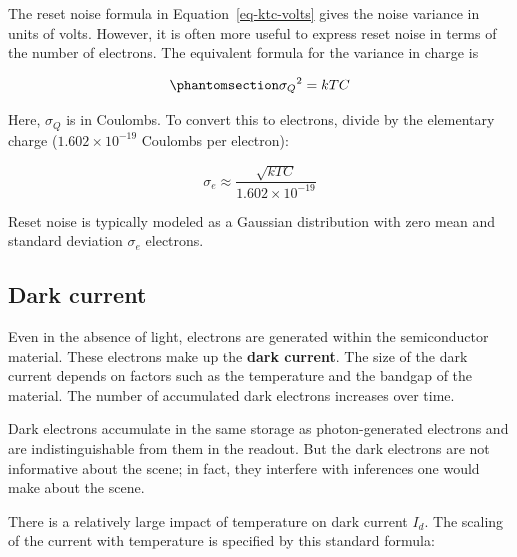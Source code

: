 \documentclass[
  letterpaper,
]{book}
\begin{document}
\begin{tcolorbox}[enhanced jigsaw, opacityback=0, breakable, coltitle=black, leftrule=.75mm, left=2mm, colframe=quarto-callout-note-color-frame, opacitybacktitle=0.6, bottomtitle=1mm, bottomrule=.15mm, toprule=.15mm, title=\textcolor{quarto-callout-note-color}{\faInfo}\hspace{0.5em}{Reset noise units}, titlerule=0mm, toptitle=1mm, colback=white, rightrule=.15mm, colbacktitle=quarto-callout-note-color!10!white, arc=.35mm]

The reset noise formula in Equation~\ref{eq-ktc-volts} gives the noise
variance in units of volts. However, it is often more useful to express
reset noise in terms of the number of electrons. The equivalent formula
for the variance in charge is

\begin{equation}\phantomsection\label{eq-ktc-electrons}{
{\sigma_Q}^2 = k T C
}\end{equation}

Here, \({\sigma_Q}\) is in Coulombs. To convert this to electrons,
divide by the elementary charge (\(1.602 \times 10^{-19}\) Coulombs per
electron):

\[
\sigma_e \approx \frac{\sqrt{k T C}}{1.602 \times 10^{-19}}
\]

Reset noise is typically modeled as a Gaussian distribution with zero
mean and standard deviation \(\sigma_e\) electrons.

\end{tcolorbox}

\subsection{Dark current}\label{sec-dark-current}

Even in the absence of light, electrons are generated within the
semiconductor material. These electrons make up the \textbf{dark
current}. The size of the dark current depends on factors such as the
temperature and the bandgap of the material. The number of accumulated
dark electrons increases over time.

Dark electrons accumulate in the same storage as photon-generated
electrons and are indistinguishable from them in the readout. But the
dark electrons are not informative about the scene; in fact, they
interfere with inferences one would make about the scene.

There is a relatively large impact of temperature on dark current
\(I_d\). The scaling of the current with temperature is specified by
this standard formula:
\end{document}
